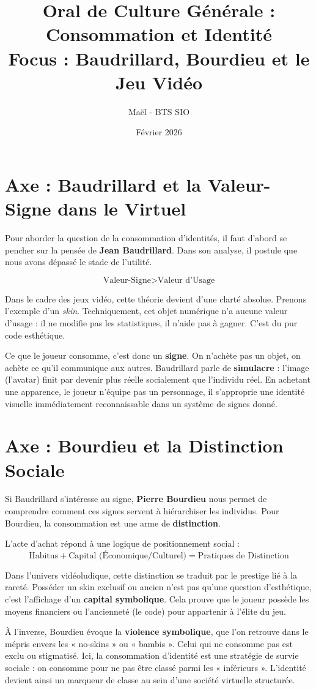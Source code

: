 \documentclass[12pt]{article}
\title{Oral de Culture Générale : Consommation et Identité \\ \large Focus : Baudrillard, Bourdieu et le Jeu Vidéo}
\author{Maël - BTS SIO}
\date{Février 2026}
\begin{document}
\maketitle

\section*{Axe : Baudrillard et la Valeur-Signe dans le Virtuel}

Pour aborder la question de la consommation d'identités, il faut d'abord se pencher sur la pensée de \textbf{Jean Baudrillard}. Dans son analyse, il postule que nous avons dépassé le stade de l'utilité. 

\[ \text{Valeur-Signe} > \text{Valeur d'Usage} \]

Dans le cadre des jeux vidéo, cette théorie devient d'une clarté absolue. Prenons l'exemple d'un \textit{skin}. Techniquement, cet objet numérique n'a aucune valeur d'usage : il ne modifie pas les statistiques, il n'aide pas à gagner. C'est du pur code esthétique.

Ce que le joueur consomme, c'est donc un \textbf{signe}. On n'achète pas un objet, on achète ce qu'il communique aux autres. Baudrillard parle de \textbf{simulacre} : l'image (l'avatar) finit par devenir plus réelle socialement que l'individu réel. En achetant une apparence, le joueur n'équipe pas un personnage, il s'approprie une identité visuelle immédiatement reconnaissable dans un système de signes donné.

\clearpage

\section*{Axe : Bourdieu et la Distinction Sociale}

Si Baudrillard s'intéresse au signe, \textbf{Pierre Bourdieu} nous permet de comprendre comment ces signes servent à hiérarchiser les individus. Pour Bourdieu, la consommation est une arme de \textbf{distinction}.

L'acte d'achat répond à une logique de positionnement social :
\[ \text{Habitus} + \text{Capital (Économique/Culturel)} = \text{Pratiques de Distinction} \]

Dans l'univers vidéoludique, cette distinction se traduit par le prestige lié à la rareté. Posséder un skin exclusif ou ancien n'est pas qu'une question d'esthétique, c'est l'affichage d'un \textbf{capital symbolique}. Cela prouve que le joueur possède les moyens financiers ou l'ancienneté (le code) pour appartenir à l'élite du jeu.

À l'inverse, Bourdieu évoque la \textbf{violence symbolique}, que l'on retrouve dans le mépris envers les « no-skins » ou « bambis ». Celui qui ne consomme pas est exclu ou stigmatisé. Ici, la consommation d'identité est une stratégie de survie sociale : on consomme pour ne pas être classé parmi les « inférieurs ». L'identité devient ainsi un marqueur de classe au sein d'une société virtuelle structurée.
\end{document}
